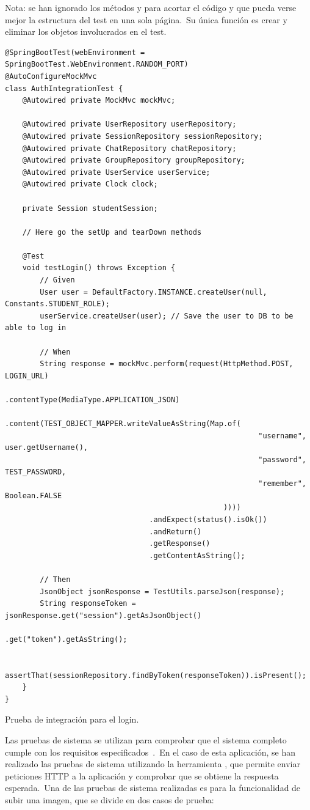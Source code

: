 	{\footnotesize Nota: se han ignorado los métodos  y  para acortar el código y
que pueda verse mejor la estructura del test en una sola página.\ Su única función es crear y eliminar los objetos
involucrados en el test.}
\begin{codeBlock}
	\begin{verbatim}
@SpringBootTest(webEnvironment = SpringBootTest.WebEnvironment.RANDOM_PORT)
@AutoConfigureMockMvc
class AuthIntegrationTest {
	@Autowired private MockMvc mockMvc;

	@Autowired private UserRepository userRepository;
	@Autowired private SessionRepository sessionRepository;
	@Autowired private ChatRepository chatRepository;
	@Autowired private GroupRepository groupRepository;
	@Autowired private UserService userService;
	@Autowired private Clock clock;

	private Session studentSession;

	// Here go the setUp and tearDown methods

	@Test
	void testLogin() throws Exception {
		// Given
		User user = DefaultFactory.INSTANCE.createUser(null, Constants.STUDENT_ROLE);
		userService.createUser(user); // Save the user to DB to be able to log in

		// When
		String response = mockMvc.perform(request(HttpMethod.POST, LOGIN_URL)
												  .contentType(MediaType.APPLICATION_JSON)
												  .content(TEST_OBJECT_MAPPER.writeValueAsString(Map.of(
														  "username", user.getUsername(),
														  "password", TEST_PASSWORD,
														  "remember", Boolean.FALSE
												  ))))
								 .andExpect(status().isOk())
								 .andReturn()
								 .getResponse()
								 .getContentAsString();

		// Then
		JsonObject jsonResponse = TestUtils.parseJson(response);
		String responseToken = jsonResponse.get("session").getAsJsonObject()
                                           .get("token").getAsString();

		assertThat(sessionRepository.findByToken(responseToken)).isPresent();
	}
}
	\end{verbatim}
	\caption{Prueba de integración para el login.}
	\label{code:pruebas-integracion-login}
\end{codeBlock}


Las pruebas de sistema se utilizan para comprobar que el sistema completo
cumple con los requisitos especificados~\cite{system_testing}.\ En el caso de esta aplicación, se han realizado
las pruebas de sistema
utilizando la herramienta , que permite enviar peticiones HTTP a la aplicación y comprobar que se
obtiene la respuesta esperada.\ Una de las pruebas de sistema realizadas es para la funcionalidad de
subir una imagen, que se divide en dos casos de prueba:

